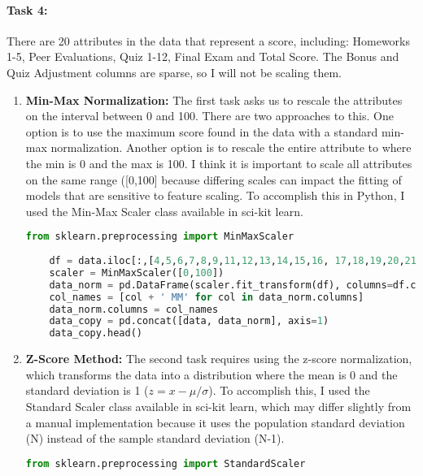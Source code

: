 \documentclass{article}
\begin{document}
\paragraph{\textbf{Task 4:}} 
There are 20 attributes in the data that represent a score, including: Homeworks 1-5, Peer Evaluations, Quiz 1-12, Final Exam and Total Score. The Bonus and Quiz Adjustment columns are sparse, so I will not be scaling them.
\begin{enumerate}
    \item \textbf{Min-Max Normalization:} The first task asks us to rescale the attributes on the interval between 0 and 100. There are two approaches to this. One option is to use the maximum score found in the data with a standard min-max normalization. Another option is to rescale the entire attribute to where the min is 0 and the max is 100. I think it is important to scale all attributes on the same range ([0,100] because differing scales can impact the fitting of models that are sensitive to feature scaling. To accomplish this in Python, I used the Min-Max Scaler class available in sci-kit learn. 
    \begin{lstlisting}[language=Python]
    from sklearn.preprocessing import MinMaxScaler
    
    df = data.iloc[:,[4,5,6,7,8,9,11,12,13,14,15,16, 17,18,19,20,21,22,26,27]]
    scaler = MinMaxScaler([0,100])
    data_norm = pd.DataFrame(scaler.fit_transform(df), columns=df.columns)
    col_names = [col + ' MM' for col in data_norm.columns]
    data_norm.columns = col_names
    data_copy = pd.concat([data, data_norm], axis=1)
    data_copy.head()
    \end{lstlisting}
    \item \textbf{Z-Score Method:} The second task requires using the z-score normalization, which transforms the data into a distribution where the mean is 0 and the standard deviation is 1 
    ($z = x - \mu / \sigma$). To accomplish this, I used the Standard Scaler class available in sci-kit learn, which may differ slightly from a manual implementation because it uses the population standard deviation (N) instead of the sample standard deviation (N-1).
    \begin{lstlisting}[language=Python]
    from sklearn.preprocessing import StandardScaler
    

\end{lstlisting}
\end{enumerate}
\end{document}
